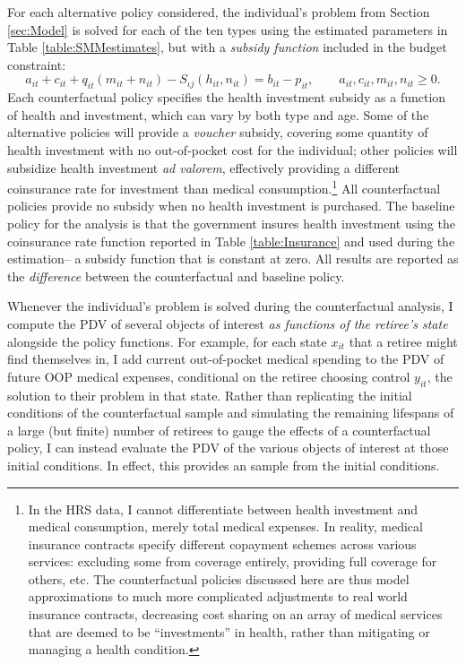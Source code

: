 \documentclass[12pt,pdftex,letterpaper]{article}
\newcommand{\Type}{\iota}
\newcommand{\Health}{h}
\newcommand{\Con}{c}
\newcommand{\Care}{m}
\newcommand{\Invst}{n}
\newcommand{\Bank}{b}
\newcommand{\Assets}{a}
\newcommand{\Premium}{p}
\newcommand{\Copay}{q}
\newcommand{\Subsidy}{S}
\newcommand{\Age}{j}
\newcommand{\State}{x}
\newcommand{\Control}{y}
\begin{document}
For each alternative policy considered, the individual's problem from Section \ref{sec:Model} is solved for each of the ten types using the estimated parameters in Table \ref{table:SMMestimates}, but with a \textit{subsidy function} included in the budget constraint:
\begin{equation} \label{BudgetAlt}
\Assets_{it} + \Con_{it} + \Copay_{it} (\Care_{it} + \Invst_{it}) - \Subsidy_{\Type \Age}(\Health_{it},\Invst_{it}) = \Bank_{it} - \Premium_{it}, \qquad \Assets_{it},\Con_{it}, \Care_{it}, \Invst_{it} \geq 0.
\end{equation}
Each counterfactual policy specifies the health investment subsidy as a function of health and investment, which can vary by both type and age.  Some of the alternative policies will provide a \textit{voucher} subsidy, covering some quantity of health investment with no out-of-pocket cost for the individual; other policies will subsidize health investment \textit{ad valorem}, effectively providing a different coinsurance rate for investment than medical consumption.\footnote{In the HRS data, I cannot differentiate between health investment and medical consumption, merely total medical expenses.  In reality, medical insurance contracts specify different copayment schemes across various services: excluding some from coverage entirely, providing full coverage for others, etc.  The counterfactual policies discussed here are thus model approximations to much more complicated adjustments to real world insurance contracts, decreasing cost sharing on an array of medical services that are deemed to be ``investments'' in health, rather than mitigating or managing a health condition.}  All counterfactual policies provide no subsidy when no health investment is purchased.  The baseline policy for the analysis is that the government insures health investment using the coinsurance rate function reported in Table \ref{table:Insurance} and used during the estimation-- a subsidy function that is constant at zero.  All results are reported as the \textit{difference} between the counterfactual and baseline policy.

Whenever the individual's problem is solved during the counterfactual analysis, I compute the PDV of several objects of interest \textit{as functions of the retiree's state} alongside the policy functions.  For example, for each state $\State_{it}$ that a retiree might find themselves in, I add current out-of-pocket medical spending to the PDV of future OOP medical expenses, conditional on the retiree choosing control $\Control_{it}$, the solution to their problem in that state.  Rather than replicating the initial conditions of the counterfactual sample and simulating the remaining lifespans of a large (but finite) number of retirees to gauge the effects of a counterfactual policy, I can instead evaluate the PDV of the various objects of interest at those initial conditions.  In effect, this provides an  sample from the initial conditions.
\end{document}
